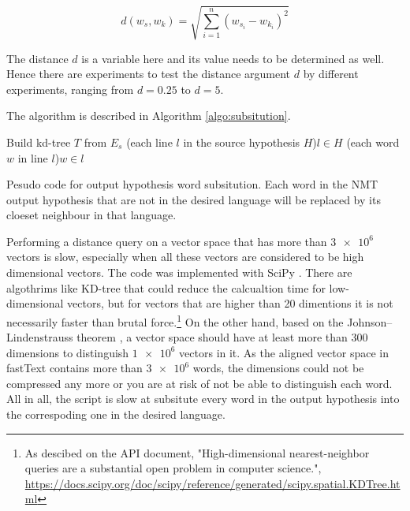 \documentclass[thesis,fonts=libertine]{cluu}
\begin{document}
\begin{equation}
  d(w_s, w_k)=\sqrt{\sum_{i=1}^n{(w_{s_i}-w_{k_i})}^2}
\end{equation}

The distance $d$ is a variable here and its value needs to be determined as well. Hence there are experiments to test the distance argument $d$ by different experiments, ranging from $d=0.25$ to $d=5$.

The algorithm is described in Algorithm \ref{algo:subsitution}.

\begin{algorithm}[h]
  \SetAlgoLined

  Build kd-tree $T$ from $E_s$
  \For(each line $l$ in the source hypothesis $H$){$l \in H$}{
    \For(each word $w$ in line $l$){$w \in l$}{
    }
  }
  \caption{Pesudo code for output hypothesis word subsitution. Each word in the NMT output hypothesis that are not in the desired language will be replaced by its cloeset neighbour in that language.}
  \label{algo:subsitution}
\end{algorithm}

Performing a distance query on a vector space that has more than $\num{3e6}$ vectors is slow, especially when all these vectors are considered to be high dimensional vectors. The code was implemented with SciPy \parencite{Virtanen:2019aa}. There are algothrims like KD-tree \parencite{Maneewongvatana:aa} that could reduce the calcualtion time for low-dimensional vectors, but for vectors that are higher than 20 dimentions it is not necessarily faster than brutal force.\footnote{As descibed on the API document, "High-dimensional nearest-neighbor queries are a substantial open problem in computer science.", \url{https://docs.scipy.org/doc/scipy/reference/generated/scipy.spatial.KDTree.html}} On the other hand, based on the Johnson–Lindenstrauss theorem \parencite{johnson1984extensions}, a vector space should have at least more than 300 dimensions to distinguish $\num{1e6}$ vectors in it. As the aligned vector space in fastText contains more than $\num{3e6}$ words, the dimensions could not be compressed any more or you are at risk of not be able to distinguish each word. All in all, the script is slow at subsitute every word in the output hypothesis into the correspoding one in the desired language.
\end{document}
